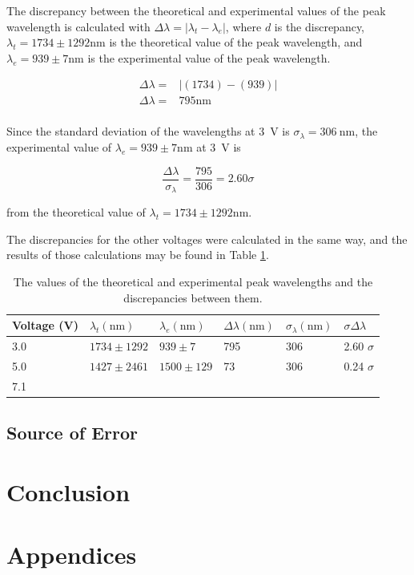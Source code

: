 \documentclass[a4paper]{article}
\begin{document}
\qq The discrepancy between the theoretical and experimental values of the peak
wavelength is calculated with
\( \Delta \lambda = | \lambda_t - \lambda_e | \), where \( d \) is the
discrepancy, \( \lambda_t = 1734 \pm 1292 \si{\nano\meter} \) is the theoretical
value of the peak wavelength, and
\( \lambda_e = 939 \pm 7 \si{\nano\meter} \) is the experimental value of
the peak wavelength.

\begin{align*}
  \Delta \lambda =& \left| (1734) - (939) \right| \\
  \Delta \lambda =& 795 \si{\nano\meter} \\
\end{align*}

Since the standard deviation of the wavelengths at \SI{3}{\volt} is \(
\sigma_{\lambda} = \SI{306}{\nano\meter} \), the experimental value of \(
\lambda_e = 939 \pm 7 \si{\nano\meter} \) at \SI{3}{\volt} is

\begin{equation*}
  \frac{\Delta \lambda}{\sigma_{\lambda}} = \frac{795}{306} = 2.60 \sigma
\end{equation*}

from the theoretical value of \( \lambda_t = 1734 \pm 1292 \si{\nano\meter} \).

\qq The discrepancies for the other voltages were calculated in the same way,
and the results of those calculations may be found in Table
\ref{tab:peakWavelengths}.

\begin{table}[H]
  \caption{The values of the theoretical and experimental peak wavelengths and
    the discrepancies between them.}
  \label{tab:peakWavelengths}
  \begin{center}
    \begin{tabular}{|l|l|l|l|l|l|}
      \hline
      Voltage (\si{\volt}) & \( \lambda_t (\si{\nano\meter}) \) & 
      \( \lambda_e (\si{\nano\meter}) \) & 
      \( \Delta \lambda (\si{\nano\meter}) \) & 
      \( \sigma_{\lambda} (\si{\nano\meter}) \) &
      \( \sigma \Delta \lambda \) \\
      \hline
      3.0 & \( 1734 \pm 1292 \) & \( 939 \pm 7 \) & 795 & 306 & 2.60 \( \sigma
                                                                \) \\
      5.0 & \( 1427 \pm 2461 \) & \( 1500 \pm 129 \) & 73 & 306 & 0.24 \( \sigma
                                                                  \) \\
      7.1 & 
    \end{tabular}
  \end{center}
\end{table}

\subsection{Source of Error}

\section{Conclusion}

\section{Appendices}
\end{document}
